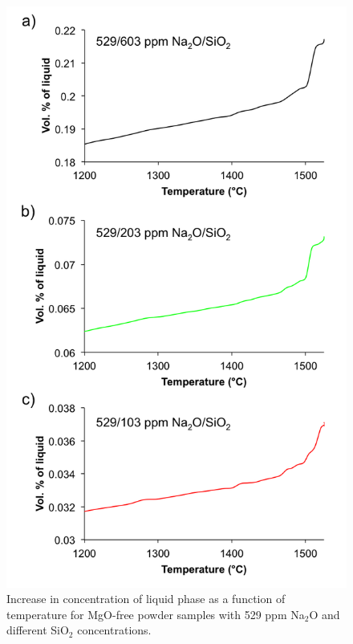\newpage
\begin{figure}[H]
	\centering
	\includegraphics[scale=0.8]{Chapter-4/Figures/Figure1.png}
	\caption{Increase in concentration of liquid phase as a function of temperature for MgO-free powder samples with 529 ppm Na$_{2}$O and different SiO$_{2}$ concentrations.}
	\label{Ch4-figure:Figure1}
\end{figure}

